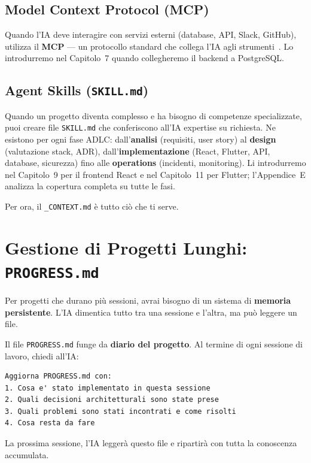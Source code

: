 \subsection{Model Context Protocol (MCP)}
Quando l'IA deve interagire con servizi esterni (database, API, Slack, GitHub), utilizza il \textbf{MCP} --- un protocollo standard che collega l'IA agli strumenti~\cite{anthropic:mcp,mcp:spec}. Lo introdurremo nel Capitolo~7 quando collegheremo il backend a PostgreSQL.

\subsection{Agent Skills (\texttt{SKILL.md})}
Quando un progetto diventa complesso e ha bisogno di competenze specializzate, puoi creare file \texttt{SKILL.md} che conferiscono all'IA expertise su richiesta. Ne esistono per ogni fase ADLC: dall'\textbf{analisi} (requisiti, user story) al \textbf{design} (valutazione stack, ADR), dall'\textbf{implementazione} (React, Flutter, API, database, sicurezza) fino alle \textbf{operations} (incidenti, monitoring). Li introdurremo nel Capitolo~9 per il frontend React e nel Capitolo~11 per Flutter; l'Appendice~E analizza la copertura completa su tutte le fasi.

Per ora, il \texttt{\_CONTEXT.md} è tutto ciò che ti serve.

\section{Gestione di Progetti Lunghi: \texttt{PROGRESS.md}}

Per progetti che durano più sessioni, avrai bisogno di un sistema di \textbf{memoria persistente}. L'IA dimentica tutto tra una sessione e l'altra, ma può leggere un file.

Il file \texttt{PROGRESS.md} funge da \textbf{diario del progetto}. Al termine di ogni sessione di lavoro, chiedi all'IA:

\begin{lstlisting}[language={}]
Aggiorna PROGRESS.md con:
1. Cosa e' stato implementato in questa sessione
2. Quali decisioni architetturali sono state prese
3. Quali problemi sono stati incontrati e come risolti
4. Cosa resta da fare
\end{lstlisting}

La prossima sessione, l'IA leggerà questo file e ripartirà con tutta la conoscenza accumulata.

